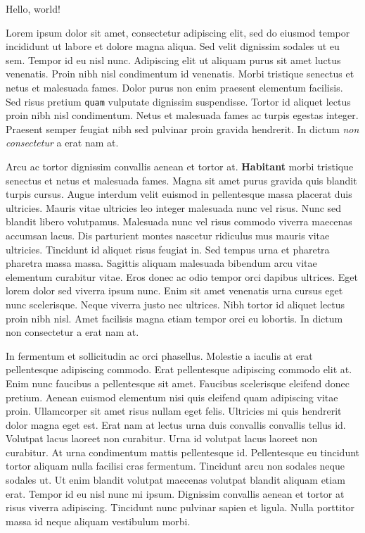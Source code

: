 \documentclass{article}
\begin{document}
\begingroup
\fontsize{96}{108}\selectfont
Hello, world!
\endgroup

\begingroup
\fontsize{12}{14}\selectfont
Lorem ipsum dolor sit amet, consectetur adipiscing elit, sed do eiusmod tempor
incididunt ut labore et dolore magna aliqua. Sed velit dignissim sodales ut eu
sem. Tempor id eu nisl nunc. Adipiscing elit ut aliquam purus sit amet luctus
venenatis. Proin nibh nisl condimentum id venenatis. Morbi tristique senectus
et netus et malesuada fames. Dolor purus non enim praesent elementum facilisis.
Sed risus pretium {\tt quam} vulputate dignissim suspendisse. Tortor id aliquet
lectus proin nibh nisl condimentum. Netus et malesuada fames ac turpis egestas
integer. Praesent semper feugiat nibh sed pulvinar proin gravida hendrerit. In
dictum \textit{non consectetur} a erat nam at.
\endgroup

Arcu ac tortor dignissim convallis aenean et tortor at. \textbf{Habitant} morbi
tristique senectus et netus et malesuada fames. Magna sit amet purus gravida
quis blandit turpis cursus. Augue interdum velit euismod in pellentesque massa
placerat duis ultricies. Mauris vitae ultricies leo integer malesuada nunc vel
risus. Nunc sed blandit libero volutpamus. Malesuada nunc vel risus commodo
viverra maecenas accumsan lacus. Dis parturient montes nascetur ridiculus mus
mauris vitae ultricies. Tincidunt id aliquet risus feugiat in. Sed tempus urna
et pharetra pharetra massa massa. Sagittis aliquam malesuada bibendum arcu
vitae elementum curabitur vitae. Eros donec ac odio tempor orci dapibus
ultrices. Eget lorem dolor sed viverra ipsum nunc. Enim sit amet venenatis urna
cursus eget nunc scelerisque. Neque viverra justo nec ultrices. Nibh tortor id
aliquet lectus proin nibh nisl. Amet facilisis magna etiam tempor orci eu
lobortis. In dictum non consectetur a erat nam at.

\vspace{20mm}

In fermentum et sollicitudin ac orci phasellus. Molestie a iaculis at erat
pellentesque adipiscing commodo. Erat pellentesque adipiscing commodo elit at.
Enim nunc faucibus a pellentesque sit amet. Faucibus scelerisque eleifend donec
pretium. Aenean euismod elementum nisi quis eleifend quam adipiscing vitae
proin. Ullamcorper sit amet risus nullam eget felis. Ultricies mi quis
hendrerit dolor magna eget est. Erat nam at lectus urna duis convallis
convallis tellus id. Volutpat lacus laoreet non curabitur. Urna id volutpat
lacus laoreet non curabitur. At urna condimentum mattis pellentesque id.
Pellentesque eu tincidunt tortor aliquam nulla facilisi cras fermentum.
Tincidunt arcu non sodales neque sodales ut. Ut enim blandit volutpat maecenas
volutpat blandit aliquam etiam erat. Tempor id eu nisl nunc mi ipsum. Dignissim
convallis aenean et tortor at risus viverra adipiscing. Tincidunt nunc pulvinar
sapien et ligula. Nulla porttitor massa id neque aliquam vestibulum morbi.
\end{document}
